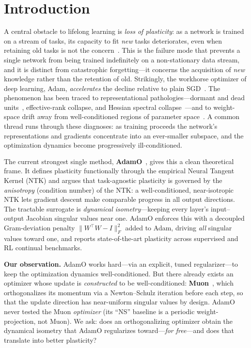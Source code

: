 \documentclass[letterpaper,twocolumn,10pt]{article}
\begin{document}
\section{Introduction}
A central obstacle to lifelong learning is \emph{loss of plasticity}: as a network is trained on a stream of tasks, its capacity to fit \emph{new} tasks deteriorates, even when retaining old tasks is not the concern~\citep{dohare2024}. This is the failure mode that prevents a single network from being trained indefinitely on a non-stationary data stream, and it is distinct from catastrophic forgetting---it concerns the acquisition of \emph{new} knowledge rather than the retention of old. Strikingly, the workhorse optimizer of deep learning, Adam, \emph{accelerates} the decline relative to plain SGD~\citep{dohare2024}. The phenomenon has been traced to representational pathologies---dormant and dead units~\citep{sokar2023}, effective-rank collapse, and Hessian spectral collapse~\citep{spectralcollapse2025}---and to weight-space drift away from well-conditioned regions of parameter space~\citep{kumar2023}. A common thread runs through these diagnoses: as training proceeds the network's representations and gradients concentrate into an ever-smaller subspace, and the optimization dynamics become progressively ill-conditioned.

The current strongest single method, \textbf{AdamO}~\citep{adamo2026}, gives this a clean theoretical frame. It defines plasticity functionally through the empirical Neural Tangent Kernel (NTK) and argues that task-agnostic plasticity is governed by the \emph{anisotropy} (condition number) of the NTK: a well-conditioned, near-isotropic NTK lets gradient descent make comparable progress in all output directions. The tractable surrogate is \emph{dynamical isometry}---keeping every layer's input--output Jacobian singular values near one. AdamO enforces this with a decoupled Gram-deviation penalty $\|W^\top W - I\|_F^2$ added to Adam, driving \emph{all} singular values toward one, and reports state-of-the-art plasticity across supervised and RL continual benchmarks.

\textbf{Our observation.} AdamO works hard---via an explicit, tuned regularizer---to keep the optimization dynamics well-conditioned. But there already exists an optimizer whose update is \emph{constructed} to be well-conditioned: \textbf{Muon}~\citep{muon2024}, which orthogonalizes its momentum via a Newton--Schulz iteration before each step, so that the update direction has near-uniform singular values by design. AdamO never tested the Muon \emph{optimizer} (its ``NS'' baseline is a periodic weight-projection, not Muon). We ask: does an orthogonalizing optimizer obtain the dynamical isometry that AdamO regularizes toward---\emph{for free}---and does that translate into better plasticity?
\end{document}
